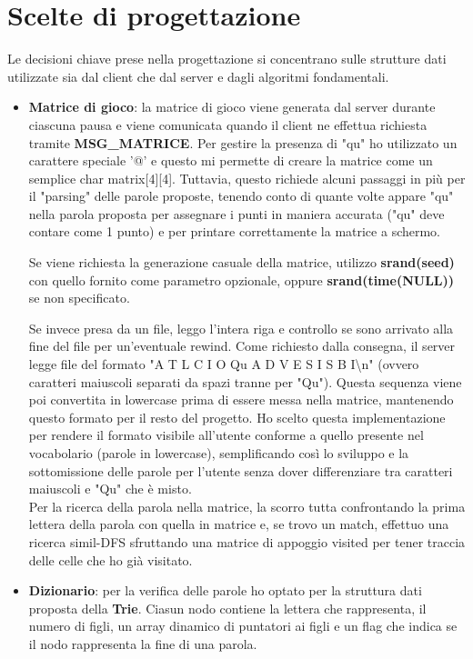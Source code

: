 \documentclass[a4paper]{article}
\begin{document}
    \clearpage
    \section{Scelte di progettazione}
    Le decisioni chiave prese nella progettazione si concentrano sulle strutture dati utilizzate sia dal client che dal server e dagli algoritmi fondamentali.
    \begin{itemize}
        \item \textbf{Matrice di gioco}: la matrice di gioco viene generata dal server durante ciascuna pausa e viene comunicata quando il client ne effettua richiesta tramite \textbf{MSG\_MATRICE}. Per gestire la presenza di "qu" ho utilizzato un carattere speciale '@' e questo mi permette di creare la matrice come un semplice char matrix[4][4]. Tuttavia, questo richiede alcuni passaggi in più per il "parsing" delle parole proposte, tenendo conto di quante volte appare "qu" nella parola proposta per assegnare i punti in maniera accurata ("qu" deve contare come 1 punto) e per printare correttamente la matrice a schermo. 

        Se viene richiesta la generazione casuale della matrice, utilizzo \textbf{srand(seed)} con quello fornito come parametro opzionale, oppure \textbf{srand(time(NULL))} se non specificato. 
        
        Se invece presa da un file, leggo l'intera riga e controllo se sono arrivato alla fine del file per un'eventuale rewind. Come richiesto dalla consegna, il server legge file del formato "A T L C I O Qu A D V E S I S B I\textbackslash n" (ovvero caratteri maiuscoli separati da spazi tranne per "Qu"). Questa sequenza viene poi convertita in lowercase prima di essere messa nella matrice, mantenendo questo formato per il resto del progetto. Ho scelto questa implementazione per rendere il formato visibile all'utente conforme a quello presente nel vocabolario (parole in lowercase), semplificando così lo sviluppo e la sottomissione delle parole per l'utente senza dover differenziare tra caratteri maiuscoli e "Qu" che è misto.\\
        Per la ricerca della parola nella matrice, la scorro tutta confrontando la prima lettera della parola con quella in matrice e, se trovo un match, effettuo una ricerca simil-DFS sfruttando una matrice di appoggio visited per tener traccia delle celle che ho già visitato.
        \item \textbf{Dizionario}: per la verifica delle parole ho optato per la struttura dati proposta della \textbf{Trie}. Ciasun nodo contiene la lettera che rappresenta, il numero di figli, un array dinamico di puntatori ai figli e un flag che indica se il nodo rappresenta la fine di una parola.
        

\end{itemize}
\end{document}
